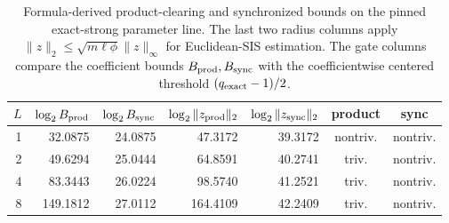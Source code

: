 \begin{table}[t]
\centering
\caption{Formula-derived product-clearing and synchronized bounds on the pinned exact-strong parameter line.  The last two radius columns apply $\|z\|_2\le\sqrt{m\ell\phi}\|z\|_\infty$ for Euclidean-SIS estimation.  The gate columns compare the coefficient bounds $B_{\rm prod},B_{\rm sync}$ with the coefficientwise centered threshold $(q_{\rm exact}-1)/2$.}
\label{tab:product-sync}
\scriptsize
\begin{tabular}{r@{\quad}r@{\quad}r@{\quad}r@{\quad}r@{\quad}c@{\quad}c}
\toprule
$L$ & $\log_2 B_{\rm prod}$ & $\log_2 B_{\rm sync}$ & $\log_2\|z_{\rm prod}\|_2$ & $\log_2\|z_{\rm sync}\|_2$ & product & sync\\
\midrule
1&32.0875&24.0875&47.3172&39.3172&nontriv.&nontriv.\\
2&49.6294&25.0444&64.8591&40.2741&triv.&nontriv.\\
4&83.3443&26.0224&98.5740&41.2521&triv.&nontriv.\\
8&149.1812&27.0112&164.4109&42.2409&triv.&nontriv.\\
\bottomrule
\end{tabular}
\end{table}

